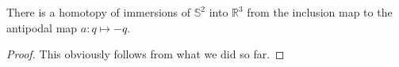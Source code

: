 %




\begin{theorem} 
    \leanok
    There is a homotopy of immersions of $𝕊^2$ into $ℝ^3$ from the inclusion map to
    the antipodal map $a : q ↦ -q$.
\end{theorem}
    

\begin{proof}
\leanok
This obviously follows from what we did so far.
\end{proof}